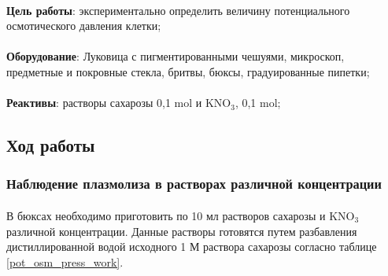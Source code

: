 \begin{footnotesize}

\paragraph*{}\textbf{Цель работы}: экспериментально определить величину потенциального осмотического давления клетки;

\paragraph*{}\textbf{Оборудование}: Луковица с пигментированными чешуями, микроскоп, предметные и покровные стекла, бритвы, бюксы, градуированные пипетки;

\paragraph*{}\textbf{Реактивы}: растворы сахарозы 0,1 \gls{mol} и KNO$_3$, 0,1 \gls{mol};

\end{footnotesize}

\subsection*{Ход работы}

\subsubsection*{Наблюдение плазмолиза в растворах различной концентрации}

\paragraph*{}В бюксах необходимо приготовить по 10 мл растворов сахарозы и KNO$_3$ различной концентрации. Данные растворы готовятся путем разбавления дистиллированной водой исходного 1 М раствора сахарозы согласно таблице \ref{pot_osm_press_work}.

